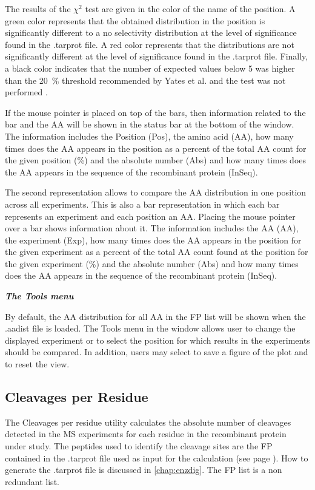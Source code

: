 The results of the $\chi^2$ test are given in the color of the name of the position. A green color represents that the obtained distribution in the position is significantly different to a no selectivity distribution at the level of significance found in the .tarprot file. A red color represents that the distributions are not significantly different at the level of significance found in the .tarprot file. Finally, a black color indicates that the number of expected values below 5 was higher than the \SI{20}{\percent} threshold recommended by Yates et al. and the test was not performed \cite{Yates1999}. 

If the mouse pointer is placed on top of the bars, then information related to the bar and the AA will be shown in the status bar at the bottom of the window. The information includes the Position (Pos), the amino acid (AA), how many times does the AA appears in the position as a percent of the total AA count for the given position (\%) and the absolute number (Abs) and how many times does the AA appears in the sequence of the recombinant protein (InSeq).

The second representation allows to compare the AA distribution in one position across all experiments. This is also a bar representation in which each bar represents an experiment and each position an AA. Placing the mouse pointer over a bar shows information about it. The information includes the AA (AA), the experiment (Exp), how many times does the AA appears in the position for the given experiment as a percent of the total AA count found at the position for the given experiment (\%) and  the absolute number (Abs) and how many times does the AA appears in the sequence of the recombinant protein (InSeq).

\textit{\textbf{The Tools menu}}

By default, the AA distribution for all AA in the FP list will be shown when the .aadist file is loaded. The Tools menu in the window allows user to change the displayed experiment or to select the position for which results in the experiments should be compared. In addition, users may select to save a figure of the plot and to reset the view. 

\subsection{Cleavages per Residue}
\label{subsec:cutsperres}
The Cleavages per residue utility calculates the absolute number of cleavages detected in the MS experiments for each residue in the recombinant protein under study. The peptides used to identify the cleavage sites are the FP contained in the .tarprot file used as input for the calculation (see page \pageref{par:PIP}). How to generate the .tarprot file is discussed in \autoref{chap:enzdig}. The FP list is a non redundant list.

